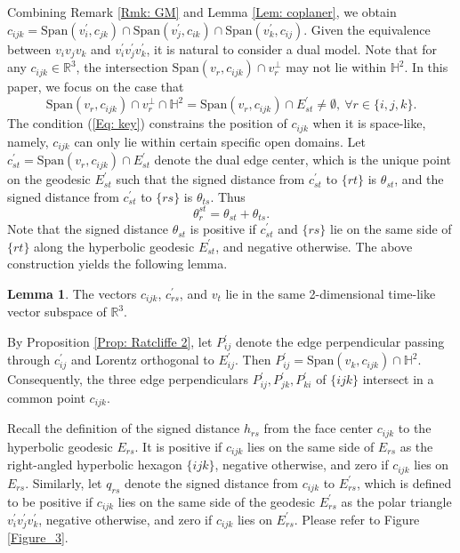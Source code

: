 \documentclass[12pt]{amsart}
\theoremstyle{definition}
\newtheorem{lemma}[theorem]{Lemma}
\begin{document}
Combining Remark \ref{Rmk: GM} and Lemma \ref{Lem: coplaner}, we obtain
$c_{ijk}=\textrm{Span}(v^\prime_i,c_{jk})
\cap\textrm{Span}(v^\prime_j,c_{ik})
\cap\textrm{Span}(v^\prime_k,c_{ij})$.
Given the equivalence between $v_iv_jv_k$ and $v^\prime_iv^\prime_jv^\prime_k$,
it is natural to consider a dual model.
Note that for any $c_{ijk}\in \mathbb{R}^3$, the intersection $\textrm{Span}(v_r,c_{ijk})\cap v_r^\bot$ may not lie within $\mathbb{H}^2$.
In this paper, we focus on the case that
\begin{equation}\label{Eq: key}
\textrm{Span}(v_r,c_{ijk})\cap v_r^\bot\cap\mathbb{H}^2
=\textrm{Span}(v_r,c_{ijk})\cap E^\prime_{st}
\neq\emptyset,\ \forall r\in \{i,j,k\}.
\end{equation}
The condition (\ref{Eq: key}) constrains the position of $c_{ijk}$ when it is space-like, namely, $c_{ijk}$ can only lie within certain specific open domains. 
Let $c^\prime_{st}=\textrm{Span}(v_r,c_{ijk})\cap E^\prime_{st}$ denote the dual edge center,
which is the unique point on the geodesic $E^\prime_{st}$ such that the signed distance from $c^\prime_{st}$ to $\{rt\}$ is $\theta_{st}$, and the signed distance from $c^\prime_{st}$ to $\{rs\}$ is $\theta_{ts}$.
Thus
\begin{equation}\label{Eq: F20}
\theta_r^{st}=\theta_{st}+\theta_{ts}.
\end{equation}
Note that the signed distance $\theta_{st}$ is positive if $c^\prime_{st}$ and $\{rs\}$ lie on the same side of $\{rt\}$ along the hyperbolic geodesic $E^\prime_{st}$, and negative otherwise.
The above construction yields the following lemma.

\begin{lemma}\label{Lem: coplaner 2}
The vectors $c_{ijk}$, $c^\prime_{rs}$, and $v_t$ lie in the same 2-dimensional time-like vector subspace of $\mathbb{R}^3$.
\end{lemma}

By Proposition \ref{Prop: Ratcliffe 2},
let $P^\prime_{ij}$ denote the edge perpendicular passing through $c^\prime_{ij}$ and Lorentz orthogonal to $E^\prime_{ij}$.
Then $P^\prime_{ij}=\textrm{Span}(v_k,c_{ijk})\cap\mathbb{H}^2$.
Consequently, the three edge perpendiculars $P^\prime_{ij},P^\prime_{jk},P^\prime_{ki}$ of $\{ijk\}$ intersect in a common point $c_{ijk}$.

Recall the definition of the signed distance $h_{rs}$ from the face center $c_{ijk}$ to the hyperbolic geodesic $E_{rs}$.
It is positive if $c_{ijk}$ lies on the same side of $E_{rs}$ as the right-angled hyperbolic hexagon $\{ijk\}$, negative otherwise, and zero if $c_{ijk}$ lies on $E_{rs}$.
Similarly, let $q_{rs}$ denote the signed distance from $c_{ijk}$ to $E^\prime_{rs}$,
which is defined to be positive if $c_{ijk}$ lies on the same side of the geodesic $E^\prime_{rs}$ as the polar triangle $v^\prime_iv^\prime_jv^\prime_k$, negative otherwise, and zero if $c_{ijk}$ lies on $E^\prime_{rs}$.
Please refer to Figure \ref{Figure_3}.
\end{document}
